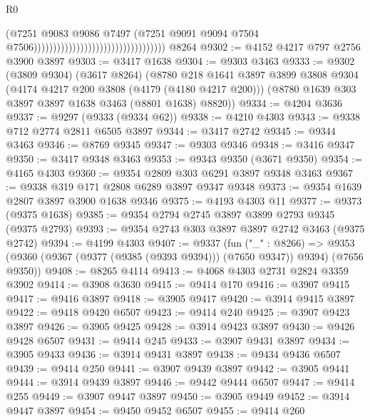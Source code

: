 \begin{lexlean}{R0}
\begin{coremodule}
                                                                    (@7251
                                                                      @9083
                                                                      @9086
                                                                      @7497
                                                                      (@7251
                                                                        @9091
                                                                        @9094
                                                                        @7504
                                                                        @7506))))))))))))))))))))))))))))))))))
    @8264
@9302 := @4152 @4217 @797 @2756 @3900 @3897
@9303 := @3417 @1638
@9304 := @9303 @3463
@9333 := @9302
    (@3809 @9304)
    (@3617 @8264)
    (@8780
      @218
      @1641
      @3897
      @3899
      @3808
      @9304
      (@4174 @4217 @200 @3808 (@4179 (@4180 @4217 @200)))
      (@8780 @1639 @303 @3897 @3897 @1638 @3463 (@8801 @1638) @8820))
@9334 := @4204 @3636
@9337 := @9297 (@9333 (@9334 @62))
@9338 := @4210 @4303
@9343 := @9338 @712 @2774 @2811 @6505 @3897
@9344 := @3417 @2742
@9345 := @9344 @3463
@9346 := @8769 @9345
@9347 := @9303 @9346
@9348 := @3416 @9347
@9350 := @3417 @9348 @3463
@9353 := @9343 @9350 (@3671 @9350)
@9354 := @4165 @4303
@9360 := @9354 @2809 @303 @6291 @3897 @9348 @3463
@9367 := @9338 @319 @171 @2808 @6289 @3897 @9347 @9348
@9373 := @9354 @1639 @2807 @3897 @3900 @1638 @9346
@9375 := @4193 @4303 @11
@9377 := @9373 (@9375 @1638)
@9385 := @9354 @2794 @2745 @3897 @3899 @2793 @9345 (@9375 @2793)
@9393 := @9354 @2743 @303 @3897 @3897 @2742 @3463 (@9375 @2742)
@9394 := @4199 @4303
@9407 := @9337
    (fun ("_" : @8266) =>
    @9353 (@9360 (@9367 (@9377 (@9385 (@9393 @9394))) (@7650 @9347)) @9394) (@7656 @9350))
@9408 := @8265 @4114
@9413 := @4068 @4303 @2731 @2824 @3359 @3902
@9414 := @3908 @3630
@9415 := @9414 @170
@9416 := @3907 @9415
@9417 := @9416 @3897
@9418 := @3905 @9417
@9420 := @3914 @9415 @3897
@9422 := @9418 @9420 @6507
@9423 := @9414 @240
@9425 := @3907 @9423 @3897
@9426 := @3905 @9425
@9428 := @3914 @9423 @3897
@9430 := @9426 @9428 @6507
@9431 := @9414 @245
@9433 := @3907 @9431 @3897
@9434 := @3905 @9433
@9436 := @3914 @9431 @3897
@9438 := @9434 @9436 @6507
@9439 := @9414 @250
@9441 := @3907 @9439 @3897
@9442 := @3905 @9441
@9444 := @3914 @9439 @3897
@9446 := @9442 @9444 @6507
@9447 := @9414 @255
@9449 := @3907 @9447 @3897
@9450 := @3905 @9449
@9452 := @3914 @9447 @3897
@9454 := @9450 @9452 @6507
@9455 := @9414 @260

\end{coremodule}
\end{lexlean}

